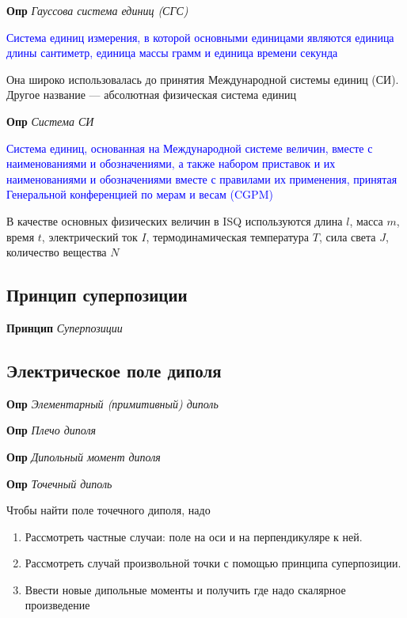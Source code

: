 \documentclass[a4paper, 14pt]{article}
\begin{document}
    \textbf{Опр} \textit{Гауссова система единиц (СГС)}
    
    \textcolor{blue}{Система единиц измерения, в которой основными единицами являются единица длины сантиметр,
        единица массы грамм и единица времени секунда}
    
    Она широко использовалась до принятия Международной системы единиц (СИ).
    Другое название — абсолютная физическая система единиц
    
    \textbf{Опр} \textit{Система СИ}
    
    \textcolor{blue}{Система единиц, основанная на Международной системе величин, вместе с наименованиями и обозначениями, а также
    набором приставок и их наименованиями и обозначениями вместе с правилами их применения, принятая Генеральной
    конференцией по мерам и весам (CGPM)}
    
    В качестве основных физических величин в ISQ используются длина $l$, масса $m$, время $t$, электрический
    ток $I$, термодинамическая температура $T$, сила света $J$, количество вещества $N$
    
    \subsection{Принцип суперпозиции}
    
    \textbf{Принцип} \textit{Суперпозиции}
    
    \subsection{Электрическое поле диполя}
    
    \textbf{Опр} \textit{Элементарный (примитивный) диполь}
    
    \textbf{Опр} \textit{Плечо диполя}
    
    \textbf{Опр} \textit{Дипольный момент диполя}
    
    \textbf{Опр} \textit{Точечный диполь}
    
    Чтобы найти поле точечного диполя, надо
    
    \begin{enumerate}
        \item Рассмотреть частные случаи: поле на оси и на перпендикуляре к ней.
        \item Рассмотреть случай произвольной точки с помощью принципа суперпозиции.
        \item Ввести новые дипольные моменты и получить где надо скалярное произведение
    \end{enumerate}
    
\end{document}
